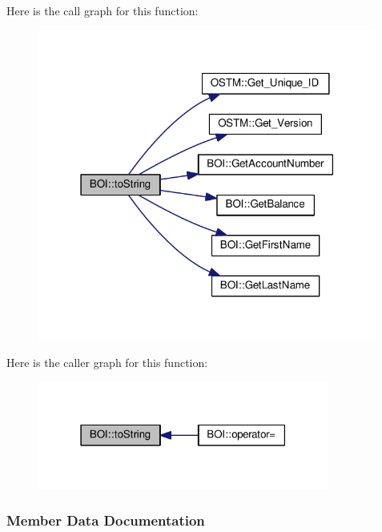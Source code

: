 Here is the call graph for this function\+:\nopagebreak
\begin{figure}[H]
\begin{center}
\leavevmode
\includegraphics[width=316pt]{class_b_o_i_ab02a4dd4ebcc5b2abfaca19f2dff2006_ab02a4dd4ebcc5b2abfaca19f2dff2006_cgraph}
\end{center}
\end{figure}




Here is the caller graph for this function\+:\nopagebreak
\begin{figure}[H]
\begin{center}
\leavevmode
\includegraphics[width=271pt]{class_b_o_i_ab02a4dd4ebcc5b2abfaca19f2dff2006_ab02a4dd4ebcc5b2abfaca19f2dff2006_icgraph}
\end{center}
\end{figure}




\subsubsection{Member Data Documentation}

